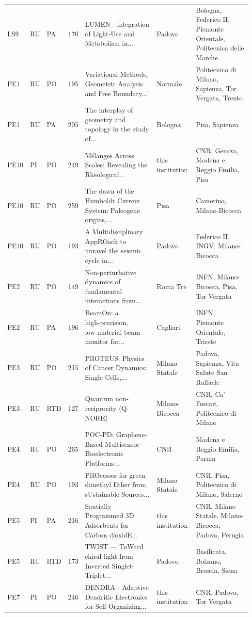 \documentclass[11pt,a4paper]{article}
\begin{document}
{\begin{longtable}{lllrp{4.2cm}p{2cm}p{3.2cm}}
LS9 & RU & PA & 170 & LUMEN - integration of Light-Use and Metabolism in... & Padova & Bologna, Federico II, Piemonte Orientale, Politecnica delle Marche \\
PE1 & RU & PO & 195 & Variational Methods, Geometric Analysis and Free Boundary... & Normale & Politecnico di Milano, Sapienza, Tor Vergata, Trento \\
PE1 & RU & PA & 205 & The interplay of geometry and topology in the study of... & Bologna & Pisa, Sapienza \\
PE10 & PI & PO & 249 & Mélanges Across Scales: Revealing the Rheological... & this institution & CNR, Genova, Modena e Reggio Emilia, Pisa \\
PE10 & RU & PO & 259 & The dawn of the Humboldt Current System: Paleogene origins,... & Pisa & Camerino, Milano-Bicocca \\
PE10 & RU & PO & 193 & A Multidisciplinary AppROach to unravel the seismic cycle in... & Padova & Federico II, INGV, Milano-Bicocca \\
PE2 & RU & PO & 149 & Non-perturbative dynamics of fundamental interactions from... & Roma Tre & INFN, Milano-Bicocca, Pisa, Tor Vergata \\
PE2 & RU & PA & 196 & BeamOn: a high‑precision, low‑material beam monitor for... & Cagliari & INFN, Piemonte Orientale, Trieste \\
PE3 & RU & PO & 215 & PROTEUS: Physics of Cancer Dynamics: Single Cells,... & Milano Statale & Padova, Sapienza, Vita-Salute San Raffaele \\
PE3 & RU & RTD & 127 & Quantum non-reciprocity (Q-NORE) & Milano-Bicocca & CNR, Ca' Foscari, Politecnico di Milano \\
PE4 & RU & PO & 265 & POC-PD: Graphene-Based Multisensor Bioelectronic Platforms... & CNR & Modena e Reggio Emilia, Parma \\
PE4 & RU & PO & 193 & PROcesses for green dimethyl Ether from sUstainable Sources... & Milano Statale & CNR, Pisa, Politecnico di Milano, Salerno \\
PE5 & PI & PA & 216 & Spatially Programmed 3D Adsorbents for Carbon dioxidE... & this institution & CNR, Milano Statale, Milano-Bicocca, Padova, Perugia \\
PE5 & RU & RTD & 173 & TWIST — ToWard chiral light from Inverted Singlet-Triplet... & Padova & Basilicata, Bolzano, Brescia, Siena \\
PE7 & PI & PO & 246 & DENDRA - Adaptive Dendritic Electronics for Self-Organizing... & this institution & CNR, Padova, Tor Vergata \\

\end{longtable}}
\end{document}
